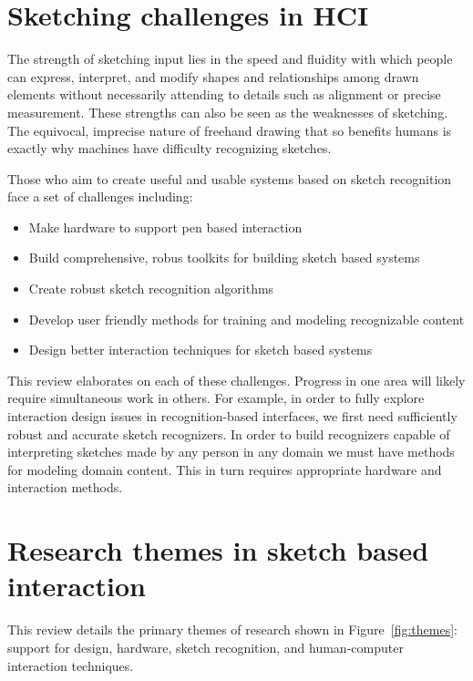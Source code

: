 \section{Sketching challenges in HCI}
\label{sec:intro-hci-challenges}

The strength of sketching input lies in the speed and fluidity with
which people can express, interpret, and modify shapes and
relationships among drawn elements without necessarily attending to
details such as alignment or precise measurement. These strengths can
also be seen as the weaknesses of sketching. The equivocal, imprecise
nature of freehand drawing that so benefits humans is exactly why
machines have difficulty recognizing sketches.

Those who aim to create useful and usable systems based on sketch
recognition face a set of challenges including:
 
\begin{itemize}
\item Make hardware to support pen based interaction
\item Build comprehensive, robus toolkits for building sketch based
  systems
\item Create robust sketch recognition algorithms
\item Develop user friendly methods for training and modeling recognizable
 content
\item Design better interaction techniques for sketch based systems
\end{itemize}

This review elaborates on each of these challenges. Progress in one
area will likely require simultaneous work in others. For example, in
order to fully explore interaction design issues in recognition-based
interfaces, we first need sufficiently robust and accurate sketch
recognizers. In order to build recognizers capable of interpreting
sketches made by any person in any domain we must have methods for
modeling domain content. This in turn requires appropriate hardware
and interaction methods.

\section{Research themes in sketch based interaction}

This review details the primary themes of research shown in
Figure~\ref{fig:themes}: support for design, hardware, sketch
recognition, and human-computer interaction techniques. 

